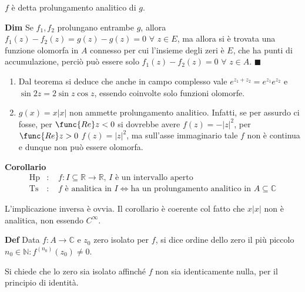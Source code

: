 \documentclass{article}
\begin{document}
$f$ \`{e} detta prolungamento analitico di $g$.

\textbf{Dim} Se $f_{1},f_{2}$ prolungano entrambe $g$, allora $f_{1}\left(
z\right) -f_{2}\left( z\right) =g\left( z\right) -g\left( z\right) =0$ $%
\forall $ $z\in E$, ma allora si \`{e} trovata una funzione olomorfa in $A$
connesso per cui l'insieme degli zeri \`{e} $E$, che ha punti di
accumulazione, perci\`{o} pu\`{o} essere solo $f_{1}\left( z\right)
-f_{2}\left( z\right) =0$ $\forall $ $z\in A$. $\blacksquare $

\begin{enumerate}
\item Dal teorema si deduce che anche in campo complesso vale $%
e^{z_{1}+z_{2}}=e^{z_{1}}e^{z_{2}}$ e $\sin 2z=2\sin z\cos z$, essendo
coinvolte solo funzioni olomorfe.

\item $g\left( x\right) =x\left\vert x\right\vert $ non ammette
prolungamento analitico. Infatti, se per assurdo ci fosse, per $\func{Re}z<0$
si dovrebbe avere $f\left( z\right) =-\left\vert z\right\vert ^{2}$, per $%
\func{Re}z>0$ $f\left( z\right) =\left\vert z\right\vert ^{2}$, ma sull'asse
immaginario tale $f$ non \`{e} continua e dunque non pu\`{o} essere olomorfa.
\end{enumerate}

\textbf{Corollario}%
\begin{eqnarray*}
\text{Hp} &\text{: }&f:I\subseteq 
\mathbb{R}
\rightarrow 
\mathbb{R}
\text{, }I\text{ \`{e} un intervallo aperto} \\
\text{Ts} &\text{: }&f\text{ \`{e} analitica in }I\Longleftrightarrow \text{
ha un prolungamento analitico in }A\subseteq 
\mathbb{C}%
\end{eqnarray*}

L'implicazione inversa \`{e} ovvia. Il corollario \`{e} coerente col fatto
che $x\left\vert x\right\vert $ non \`{e} analitica, non essendo $C^{\infty
} $.

\textbf{Def} Data $f:A\rightarrow 
\mathbb{C}
$ e $z_{0}$ zero isolato per $f$, si dice ordine dello zero il pi\`{u}
piccolo $n_{0}\in 
\mathbb{N}
:f^{\left( n_{0}\right) }\left( z_{0}\right) \neq 0$.

Si chiede che lo zero sia isolato affinch\'{e} $f$ non sia identicamente
nulla, per il principio di identit\`{a}.
\end{document}
